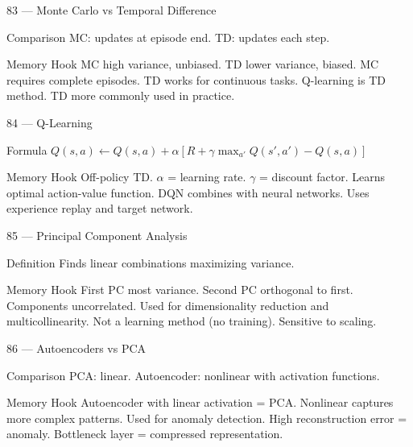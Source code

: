 \documentclass[aspectratio=169,8pt]{beamer}
\begin{document}
	\begin{frame}{83 --- Monte Carlo vs Temporal Difference}
		\begin{block}{Comparison}
			MC: updates at episode end. TD: updates each step.
		\end{block}
		\begin{block}{Memory Hook}
			MC high variance, unbiased. TD lower variance, biased. MC requires complete episodes. TD works for continuous tasks. Q-learning is TD method. TD more commonly used in practice.
		\end{block}
	\end{frame}
	
	\begin{frame}{84 --- Q-Learning}
		\begin{block}{Formula}
			$Q(s,a) \leftarrow Q(s,a) + \alpha[R + \gamma \max_{a'} Q(s',a') - Q(s,a)]$
		\end{block}
		\begin{block}{Memory Hook}
			Off-policy TD. $\alpha$ = learning rate. $\gamma$ = discount factor. Learns optimal action-value function. DQN combines with neural networks. Uses experience replay and target network.
		\end{block}
	\end{frame}
	
	\begin{frame}{85 --- Principal Component Analysis}
		\begin{block}{Definition}
			Finds linear combinations maximizing variance.
		\end{block}
		\begin{block}{Memory Hook}
			First PC most variance. Second PC orthogonal to first. Components uncorrelated. Used for dimensionality reduction and multicollinearity. Not a learning method (no training). Sensitive to scaling.
		\end{block}
	\end{frame}
	
	\begin{frame}{86 --- Autoencoders vs PCA}
		\begin{block}{Comparison}
			PCA: linear. Autoencoder: nonlinear with activation functions.
		\end{block}
		\begin{block}{Memory Hook}
			Autoencoder with linear activation = PCA. Nonlinear captures more complex patterns. Used for anomaly detection. High reconstruction error = anomaly. Bottleneck layer = compressed representation.
		\end{block}
	\end{frame}
	
\end{document}
